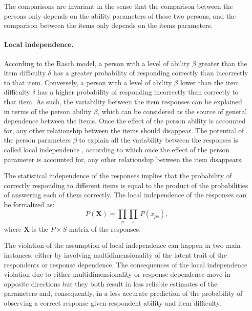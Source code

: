 \documentclass[12pt]{book}
\begin{document}
The comparisons are invariant in the sense that the comparison between the persons only depends on the ability parameters of those two persons, and the comparison between the items only depends on the items parameters. 


\paragraph{Local independence.}\label{par:local}

According to the Rasch model, a person with a  level of ability $\beta$ greater than the item difficulty $\delta$ has a greater probability of responding  correctly than incorrectly to that item. 
Conversely, a person with a level of ability $\beta$ lower than the item difficulty $\delta$ has a higher probability of responding incorrectly than correctly to that item. 
As such, the variability between the item responses can  be explained in terms of the person ability $\beta$, which can be considered as the source of general dependence between the items. Once the effect of the person ability is accounted for, any other relationship between the items should disappear. 
The potential of the person parameters $\beta$ to explain all the variability between the responses is called local independence \cite{andrich}, according to which once the effect of the person parameter is accounted for, any other relationship between the item disappears.   

The statistical independence of the responses implies that the probability of correctly responding to different items is equal to the product of the probabilities of answering each of them correctly. The local independence of the responses can be formalized as: 
\begin{equation}\label{eq:local}
	P(\bm{X}) = \prod_p \prod_s \, P(x_{ps}),
\end{equation}
where $\bm{X}$ is the $P \times S$ matrix of the responses. 

The violation of the assumption of local independence can happen in two main instances, either by involving multidimensionality of the latent trait of the respondents or response dependence. 
The consequences of the local independence violation due to either multidimensionality or response dependence move in opposite directions but they both result in less reliable estimates of the parameters and, consequently, in a less accurate prediction of the probability of observing a correct response given respondent ability and item difficulty.
\end{document}
